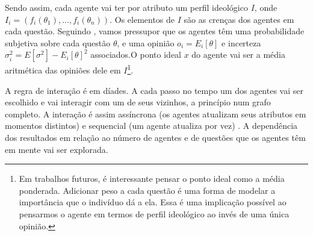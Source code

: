 

Sendo assim, cada agente vai ter por atributo um perfil ideológico \(I\), onde
\(I_i = (f_i(\theta_1), \ldots, f_i(\theta_n)) \). Os elementos de \(I\) são as crenças dos
agentes em cada questão. Seguindo , vamos pressupor
que os agentes têm uma probabilidade subjetiva sobre cada questão \(\theta\), e uma
opinião \( o_i = E_i[\theta]\) e incerteza \( \sigma_i^2 = E[\sigma^2] - E_ i[\theta]^2\)
associados.O ponto ideal \(x\) do agente vai ser a média aritmética das opiniões dele em
\(I\)\footnote{Em trabalhos futuros, é interessante pensar o ponto ideal como a
  média ponderada. Adicionar peso a cada questão é uma forma de modelar a
 importância que o indivíduo dá a ela. Essa é uma implicação possível ao
 pensarmos o agente em termos de perfil ideológico ao invés de uma única opinião.}.

A regra de interação é em díades. A cada passo no tempo um dos agentes vai ser
escolhido e vai interagir com um de seus vizinhos, a princípio num grafo
completo. A interação é assim assíncrona (os agentes atualizam seus atributos em
momentos distintos) e sequencial (um agente atualiza por vez)
\cite{wilensky2015introduction}. A dependência dos resultados em relação ao
número de agentes e de questões que os agentes têm em mente vai ser explorada.

